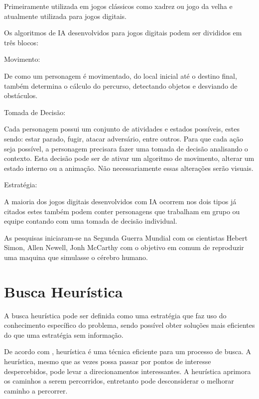 Primeiramente utilizada em jogos clássicos como xadrez ou jogo da velha e atualmente utilizada para jogos digitais.

Os algoritmos de IA desenvolvidos para jogos digitais podem ser divididos em três blocos:

\begin{alineascomponto}
	
\item Movimento:

De como um personagem é movimentado, do local inicial até o destino final, também determina o cálculo do percurso, detectando objetos e desviando de obstáculos.
   
 \item Tomada de Decisão:
 
Cada personagem possui um conjunto de atividades e estados possíveis, estes sendo: estar parado, fugir, atacar adversário, entre outros. Para que cada ação seja possível, a personagem precisara fazer uma tomada de decisão analisando o contexto. Esta decisão pode ser de ativar um algoritmo de movimento, alterar um estado interno ou a animação. Não necessariamente essas alterações serão visuais.

\item Estratégia:

A maioria dos jogos digitais desenvolvidos com IA ocorrem nos dois tipos já citados estes também podem conter personagens que trabalham em grupo ou equipe contando com uma tomada de decisão individual.

	\end{alineascomponto}

	
As pesquisas iniciaram-se na Segunda Guerra Mundial com os cientistas Hebert Simon, Allen Newell,  Jonh McCarthy com o objetivo em comum de reproduzir uma maquina que simulasse o cérebro humano. \cite{ia}

\section{Busca Heurística}
\label{sec:Busca-Heurística}

A busca heurística pode ser definida como uma estratégia que faz uso do conhecimento específico do problema, sendo possível obter soluções mais eficientes do que uma estratégia sem informação. \cite{rus}

De acordo com \cite{el}, heurística é uma técnica eficiente para um processo de busca. A heurística, mesmo que as vezes possa passar por pontos de interesse despercebidos, pode levar a direcionamentos interessantes. A heurística aprimora os caminhos a serem percorridos, entretanto pode desconsiderar o melhorar caminho a percorrer. 

